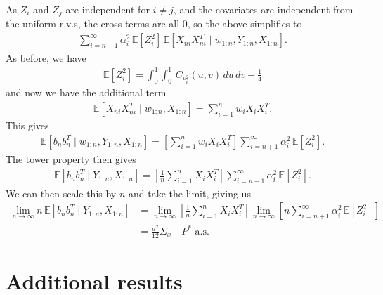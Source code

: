 \documentclass[11pt,a4paper]{article}
\newcommand{\E}{\mathbb{E}}
\begin{document}
\begin{appendices}
As $Z_i$ and $Z_j$ are independent for $i \neq j$, and the covariates are independent from the uniform r.v.s, the cross-terms are all 0, so the above simplifies to
\begin{align*}
    \sum_{i = n+1}^\infty \alpha_i^2\,  \E[Z_i^2] \,\E[X_{ni} X_{ni}^T \mid w_{1:n},  Y_{1:n},X_{1:n}].
\end{align*}
As before, we have
\begin{align*}
    \E[Z_i^2] = \int_0^1\int_0^1 \, C_{\rho_i^2}(u,v)\, du \,dv - \frac{1}{4}
\end{align*}
and now we have the additional term
\begin{align*}
   \E[X_{ni} X_{ni}^T \mid w_{1:n},X_{1:n}] = \sum_{i = 1}^n w_i X_{i}X_i^T.
\end{align*}
This gives
\begin{align*}
     \E[b_nb_n^T \mid w_{1:n}, Y_{1:n},X_{1:n}] = \left[\sum_{i = 1}^n w_i X_i X_i^T\right]\sum_{i = n+1}^\infty \alpha_i^2 \, \E[Z_i^2].
\end{align*}
The tower property then gives
\begin{align*}
    \E[b_nb_n^T\mid Y_{1:n},X_{1:n}] = \left[\frac{1}{n}\sum_{i = 1}^n X_iX_i^T\right]\sum_{i = n+1}^\infty \alpha_i^2 \, \E[Z_i^2].
\end{align*}
We can then scale this by ${n}$ and take the limit, giving us
\begin{align*}
    \lim_{n\to \infty}{n}\,\E[b_nb_n^T\mid Y_{1:n},X_{1:n} ] 
    &= \lim_{n\to \infty}\left[\frac{1}{n}\sum_{i = 1}^n X_iX_i^T\right] \lim_{n \to \infty} \left[n\sum_{i = n+1}^\infty \alpha_i^2 \, \E[Z_i^2]\right]\\    
    &= \frac{a^2}{12}\Sigma_x \quad P^*\text{-a.s.}
\end{align*}


\section{Additional results}


\end{appendices}
\end{document}
